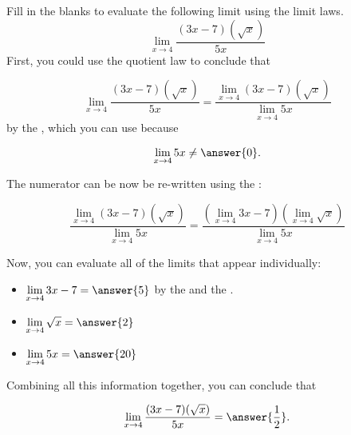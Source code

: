 \documentclass[handout]{ximera}
\begin{document}
\begin{exercise}

Fill in the blanks to evaluate the following limit using the limit laws. 
  \[
  \displaystyle\lim_{x\to 4} \frac{(3x-7)(\sqrt{x})}{5x}  \]
First, you could use the quotient law to conclude that 

\[
  \displaystyle\lim_{x\to 4} \frac{(3x-7)(\sqrt{x})}{5x} = \frac{\displaystyle\lim_{x\to 4} (3x-7)(\sqrt{x})}{\displaystyle\lim_{x\to 4} 5x} \]
by the , which you can use because 

\[
  \displaystyle\lim_{x\to 4} 5x \neq \answer{0}. \]
  
The numerator can be now be re-written using the : 

\[ \frac{\displaystyle\lim_{x\to 4} (3x-7)(\sqrt{x})}{\displaystyle\lim_{x\to 4} 5x} = \frac{\left(\displaystyle\lim_{x\to 4} 3x-7 \right) \left(\displaystyle\lim_{x\to 4}\sqrt{x}\right)}{\displaystyle\lim_{x\to 4} 5x} \]

Now, you can evaluate all of the limits that appear individually: 

\begin{itemize}

\item $\displaystyle\lim_{x\to 4} 3x-7 = \answer{5}$ by the  and the .

\item $\displaystyle\lim_{x\to 4} \sqrt{x} = \answer{2}$

\item $\displaystyle\lim_{x \to 4} 5x = \answer{20}$

\end{itemize}

Combining all this information together, you can conclude that 

\[
  \displaystyle\lim_{x\to 4} \frac{(3x-7)(\sqrt{x})}{5x} = \answer{\frac{1}{2}}.  \]

\end{exercise}
\end{document}
